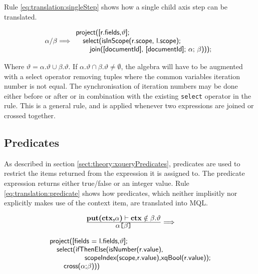 Rule \ref{eq:translation:singleStep} shows how a single child axis step can be
translated.

\begin{equation}
\centering
\alpha \textsf{/} \beta
\Longrightarrow
\begin{array}{l}
	\mbox{\textsf{project([r.fields,}} \vartheta \mbox{\textsf{];}} \\ \quad
 	\mbox{\textsf{select(isInScope(r.scope, l.scope);}} \\ \quad \quad
 	\mbox{\textsf{join([documentId], [documentId]; }} 
 	\alpha;\, \beta \mbox{\textsf{)))}}; \\
\end{array}
\label{eq:translation:singleStep}
\end{equation}

Where $\vartheta = \alpha.\vartheta \cup \beta.\vartheta$. If $\alpha.\vartheta \cap \beta.\vartheta \neq
\emptyset$, the algebra will have to be augmented with a \textsf{select} operator removing tuples where the common
variables iteration number is not equal. The synchronisation of iteration numbers may be done either before or
after or in combination with the existing \texttt{select} operator in the rule. This is a general rule, and is
applied whenever two expressions are joined or crossed together.

\subsection{Predicates}
\label{sect:translation:mXr:predicates}
As described in section \ref{sect:theory:xqueryPredicates}, predicates are used to restrict the items returned
from the expression it is assigned to. The predicate expression returns either true/false or an integer value. Rule
\ref{eq:translation:predicate} shows how predicates, which neither implisitly nor explicitly makes use of the
context item, are translated into MQL. 

\begin{equation}
\centering
\begin{array}{c}
	\frac{\displaystyle \textbf{put(ctx,}\alpha\textbf{)}\vdash\textbf{ctx}\notin\beta.\vartheta}
	{\displaystyle \alpha\texttt{[}\beta\texttt{]}}

	\Longrightarrow 
	\\
	\mbox{}
	\\
	\begin{array}{l}
		\mbox{\textsf{project([fields = l.fields,}} \vartheta \mbox{\textsf{];}} 
		\\ \quad \mbox{\textsf{select(ifThenElse(isNumber(r.value),}} \\ \quad 
		\qquad\qquad \mbox{\textsf{scopeIndex(scope,r.value),xqBool(r.value));}} \\ \quad\quad
		\mbox{\textsf{cross(}} 
		\alpha \textsf{;}
		\beta \mbox{\textsf{)))}}
	\end{array}
\end{array}
\label{eq:translation:predicate}
\end{equation}


